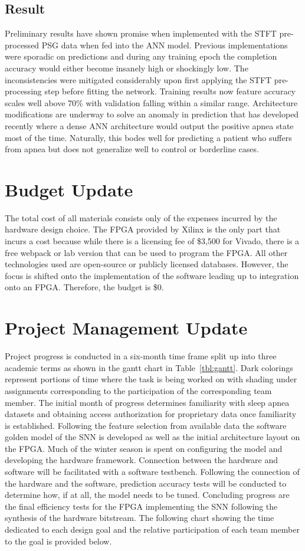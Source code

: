 \documentclass[12pt,titlepage]{article}
\begin{document}
\subsection{Result}
Preliminary results have shown promise when implemented with the STFT pre-processed PSG data when fed into the ANN model. Previous implementations were sporadic on predictions and during any training epoch the completion accuracy would either become insanely high or shockingly low. The inconsistencies were mitigated considerably upon first applying the STFT pre-processing step before fitting the network. Training results now feature accuracy scales well above 70\% with validation falling within a similar range. Architecture modifications are underway to solve an anomaly in prediction that has developed recently where a dense ANN architecture would output the positive apnea state most of the time. Naturally, this bodes well for predicting a patient who suffers from apnea but does not generalize well to control or borderline cases. 

\section{Budget Update}
The total cost of all materials consists only of the expenses incurred by the hardware design choice. The FPGA provided by Xilinx is
the only part that incurs a cost because while there is a licensing fee of \$3,500 for Vivado, there is a free webpack or lab version
that can be used to program the FPGA. All other technologies used are open-source or publicly licensed databases. However, the focus
is shifted onto the implementation of the software leading up to integration onto an FPGA. Therefore, the budget is \$0.

\section{Project Management Update}
Project progress is conducted in a six-month time frame split up into three academic terms as shown in the gantt chart in Table~\ref{tbl:gantt}.
Dark colorings represent portions of time where the task is being worked on with shading under assignments corresponding to the participation of
the corresponding team member. The initial month of progress determines familiarity with sleep
apnea datasets and obtaining access authorization for proprietary data once familiarity is established. Following the feature selection from available data
the software golden model of the SNN is developed as well as the initial architecture layout on the FPGA. Much of the winter season is spent on configuring
the model and developing the hardware framework. Connection between the hardware and software will be facilitated with a software testbench. Following the
connection of the hardware and the software, prediction accuracy tests will be conducted to determine how, if at all, the model needs to be tuned. Concluding
progress are the final efficiency tests for the FPGA implementing the SNN following the synthesis of the hardware bitstream. The following chart showing the
time dedicated to each design goal and the relative participation of each team member to the goal is provided below.
\end{document}
